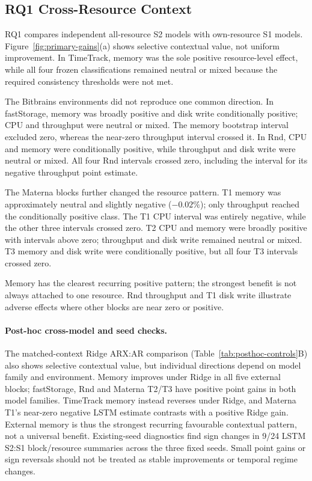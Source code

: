 \documentclass[a4paper,fleqn]{cas-dc}
\begin{document}
\subsection{RQ1 Cross-Resource Context}
\label{sec:results-rq1}

RQ1 compares independent all-resource S2 models with own-resource S1
models. Figure~\ref{fig:primary-gains}(a) shows selective
contextual value, not uniform improvement. In TimeTrack, memory was the sole
positive resource-level effect, while all four frozen classifications remained
neutral or mixed because the required consistency thresholds were not met.

The Bitbrains environments did not reproduce one common direction. In
fastStorage, memory was broadly positive and disk write conditionally positive;
CPU and throughput were neutral or mixed. The memory bootstrap interval
excluded zero, whereas the near-zero throughput interval crossed it. In Rnd,
CPU and memory were conditionally positive, while throughput and disk write
were neutral or mixed. All four Rnd intervals crossed zero, including the
interval for its negative throughput point estimate.

The Materna blocks further changed the resource pattern. T1 memory was
approximately neutral and slightly negative ($-0.02\%$); only throughput
reached the conditionally positive class. The T1 CPU interval was entirely
negative, while the other three intervals crossed zero. T2 CPU and memory
were broadly positive with intervals above zero; throughput and disk write
remained neutral or mixed. T3 memory and disk write were conditionally
positive, but all four T3 intervals crossed zero.

Memory has the clearest recurring positive pattern; the strongest benefit is
not always attached to one resource. Rnd throughput and T1 disk write illustrate
adverse effects where other blocks are near zero or positive.

\paragraph{Post-hoc cross-model and seed checks.}
The matched-context Ridge ARX:AR comparison
(Table~\ref{tab:posthoc-controls}B) also shows selective contextual value,
but individual directions depend on model family and environment. Memory
improves under Ridge in all five external blocks; fastStorage, Rnd and
Materna T2/T3 have positive point gains in both model families. TimeTrack
memory instead reverses under Ridge, and Materna T1's near-zero negative
LSTM estimate contrasts with a positive Ridge gain. External memory is thus
the strongest recurring favourable contextual pattern, not a universal
benefit. Existing-seed diagnostics find sign changes in 9/24 LSTM S2:S1
block/resource summaries across the three fixed seeds. Small point gains or
sign reversals should not be treated as stable improvements or temporal
regime changes.
\end{document}
